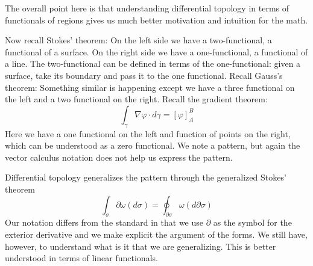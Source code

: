 \documentclass[10pt,twocolumn, nofootinbib]{revtex4-2}
\begin{document}
The overall point here is that understanding differential topology in terms of functionals of regions gives us much better motivation and intuition for the math.

\iffalse





Now recall Stokes' theorem:
On the left side we have a two-functional, a functional of a surface. On the right side we have a one-functional, a functional of a line. The two-functional can be defined in terms of the one-functional: given a surface, take its boundary and pass it to the one functional. Recall Gauss's theorem:
Something similar is happening except we have a three functional on the left and a two functional on the right. Recall the gradient theorem:
\begin{equation*}
	\int_\gamma \nabla \varphi \cdot d\gamma = \left[ \varphi \right]_A^B
\end{equation*}
Here we have a one functional on the left and function of points on the right, which can be understood as a zero functional. We note a pattern, but again the vector calculus notation does not help us express the pattern.

Differential topology generalizes the pattern through the generalized Stokes' theorem
\begin{equation*}
	\int_\sigma \partial \omega(d\sigma) = \oint_{\partial \sigma} \omega(d\partial\sigma)
\end{equation*}
Our notation differs from the standard in that we use $\partial$ as the symbol for the exterior derivative and we make explicit the argument of the forms. We still have, however, to understand what is it that we are generalizing. This is better understood in terms of linear functionals.
\end{document}
